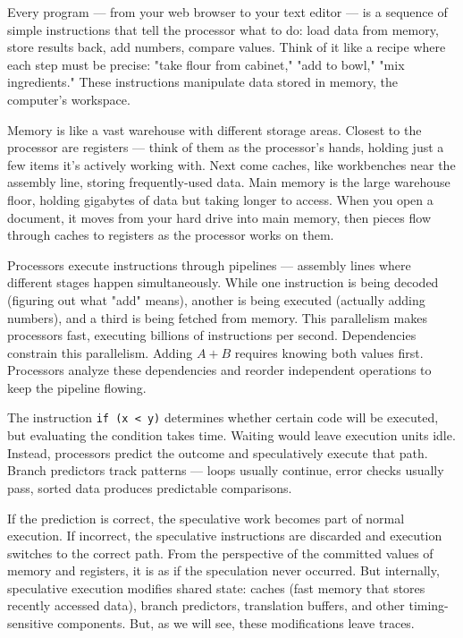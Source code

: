 Every program — from your web browser to your text editor — is a sequence of simple instructions that tell the processor what to do: load data from memory, store results back, add numbers, compare values. Think of it like a recipe where each step must be precise: "take flour from cabinet," "add to bowl," "mix ingredients." These instructions manipulate data stored in memory, the computer's workspace.

Memory is like a vast warehouse with different storage areas. Closest to the processor are registers — think of them as the processor's hands, holding just a few items it's actively working with. Next come caches, like workbenches near the assembly line, storing frequently-used data. Main memory is the large warehouse floor, holding gigabytes of data but taking longer to access. When you open a document, it moves from your hard drive into main memory, then pieces flow through caches to registers as the processor works on them.

Processors execute instructions through pipelines — assembly lines where different stages happen simultaneously. While one instruction is being decoded (figuring out what "add" means), another is being executed (actually adding numbers), and a third is being fetched from memory. This parallelism makes processors fast, executing billions of instructions per second. Dependencies constrain this parallelism. Adding $A+B$ requires knowing both values first. Processors analyze these dependencies and reorder independent operations to keep the pipeline flowing. 

The instruction \texttt{if (x < y)} determines whether certain code will be executed, but evaluating the condition takes time. Waiting would leave execution units idle. Instead, processors predict the outcome and speculatively execute that path. Branch predictors track patterns — loops usually continue, error checks usually pass, sorted data produces predictable comparisons.

If the prediction is correct, the speculative work becomes part of normal execution. If incorrect, the speculative instructions are discarded and execution switches to the correct path. From the perspective of the committed values of memory and registers, it is as if the speculation never occurred. But internally, speculative execution modifies shared state: caches (fast memory that stores recently accessed data), branch predictors, translation buffers, and other timing-sensitive components. But, as we will see, these modifications leave traces.

